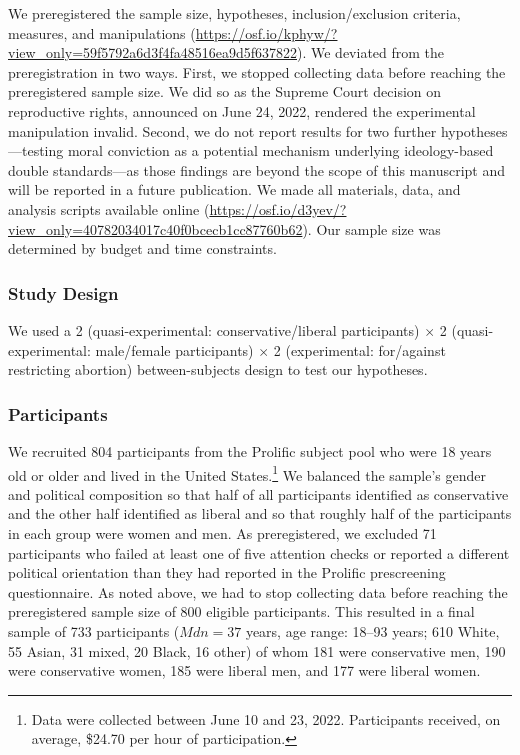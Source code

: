\documentclass[12pt, letterpaper]{article}
\begin{document}
We preregistered the sample size, hypotheses, inclusion/exclusion
criteria, measures, and manipulations
(\url{https://osf.io/kphyw/?view_only=59f5792a6d3f4fa48516ea9d5f637822}).
We deviated from the preregistration in two ways. First, we stopped
collecting data before reaching the preregistered sample size. We did so
as the Supreme Court decision on reproductive rights, announced on June
24, 2022, rendered the experimental manipulation invalid. Second, we do
not report results for two further hypotheses---testing moral conviction
as a potential mechanism underlying ideology-based double standards---as
those findings are beyond the scope of this manuscript and will be
reported in a future publication. We made all materials, data, and
analysis scripts available online
(\url{https://osf.io/d3yev/?view_only=40782034017c40f0bcecb1cc87760b62}).
Our sample size was determined by budget and time constraints.

\hypertarget{study-design-2}{%
\subsubsection{Study Design}\label{study-design-2}}

We used a 2 (quasi-experimental: conservative/liberal participants)
\(\times\) 2 (quasi-experimental: male/female participants) \(\times\) 2
(experimental: for/against restricting abortion) between-subjects design
to test our hypotheses.

\hypertarget{participants-2}{%
\subsubsection{Participants}\label{participants-2}}

We recruited 804 participants from the Prolific subject pool who were 18
years old or older and lived in the United States.\footnote{Data were
  collected between June 10 and 23, 2022. Participants received, on
  average, \$24.70 per hour of participation.} We balanced the sample's
gender and political composition so that half of all participants
identified as conservative and the other half identified as liberal and
so that roughly half of the participants in each group were women and
men. As preregistered, we excluded 71 participants who failed at least
one of five attention checks or reported a different political
orientation than they had reported in the Prolific prescreening
questionnaire. As noted above, we had to stop collecting data before
reaching the preregistered sample size of 800 eligible participants.
This resulted in a final sample of 733 participants
(\(\textit{Mdn} = 37\) years, age range: 18--93 years; 610 White, 55
Asian, 31 mixed, 20 Black, 16 other) of whom 181 were conservative men,
190 were conservative women, 185 were liberal men, and 177 were liberal
women.
\end{document}
